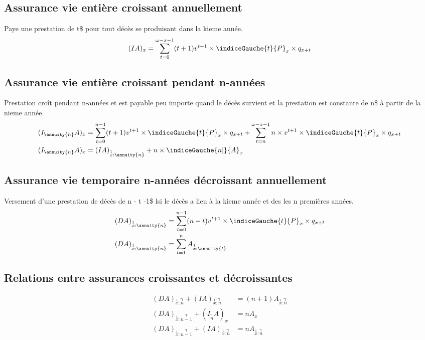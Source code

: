 \subsection{Assurance vie entière croissant annuellement}
Paye une prestation de t\$ pour tout décès se produisant dans la kieme année.
\begin{align*}
(IA)_{x} &= \sum_{t=0}^{\omega - x-1}(t + 1)v^{t+1} \times \indiceGauche{t}{P}_{x} \times q_{x+t}\\
\end{align*}

\subsection{Assurance vie  entière croissant pendant n-années}
Prestation croît pendant n-années et est payable peu importe quand le décès survient et la prestation est constante de n\$ à partir de la nieme année.
\begin{align*}
(I_{\annuity{n}}A)_{x} &= \sum_{t=0}^{n-1}(t +1 )v^{t+1} \times \indiceGauche{t}{P}_{x} \times q_{x+t}  + \sum_{t =n}^{\omega - x - 1}n \times v^{t+1} \times \indiceGauche{t}{P}_{x} \times q_{x+t}  \\
(I_{\annuity{n}}A)_{x} &= (IA)_{\overset{1}{x}:\annuity{n}} + n \times \indiceGauche{n|}{A}_x\\
\end{align*}


\subsection{Assurance vie  temporaire n-années décroissant annuellement}
Versement d'une prestation de décès de n - t -1\$ lsi le décès a lieu à la kieme année et des les n premières années.
\begin{align*}
(DA)_{\overset{1}{x}:\annuity{n}} &= \sum_{t = 0}^{n-1}(n - t )v^{t+1} \times \indiceGauche{t}{P}_{x} \times q_{x+t} \\
(DA)_{\overset{1}{x}:\annuity{n}} &= \sum_{t = 1}^{n} A_{\overset{1}{x}:\annuity{t}}
\end{align*}

\subsection{Relations entre assurances croissantes et décroissantes}
\begin{align*}
(DA)_{\overset{1}{x}:\annuity{n}} + (IA)_{\overset{1}{x}:\annuity{n}} &= (n+1) A_{\overset{1}{x}:\annuity{n}} \\
(DA)_{\overset{1}{x}:\annuity{n-1}} + (I_{\annuity{n}}A)_x &= n A_{x} \\
(DA)_{\overset{1}{x}:\annuity{n-1}} + (IA)_{\overset{1}{x}:\annuity{n}} &= n A_{\overset{1}{x}:\annuity{n}} \\
\end{align*}

